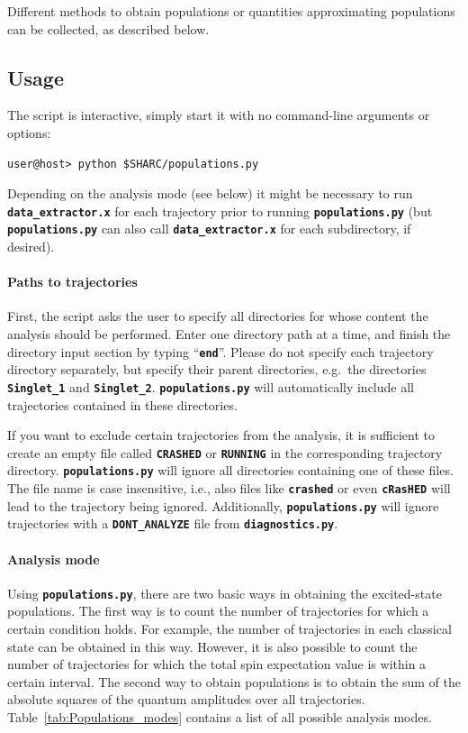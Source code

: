 \documentclass[a4paper,10pt,DIV=15,openany,twoside=false]{scrbook}
\newcommand{\ttt}[1]{\textbf{\texttt{#1}}}
\begin{document}
Different methods to obtain populations or quantities approximating populations can be collected, as described below.

\subsection{Usage}

The script is interactive, simply start it with no command-line arguments or options:
\begin{verbatim}
user@host> python $SHARC/populations.py
\end{verbatim}

Depending on the analysis mode (see below) it might be necessary to run \ttt{data\_extractor.x} for each trajectory prior to running \ttt{populations.py} (but \ttt{populations.py} can also call \ttt{data\_extractor.x} for each subdirectory, if desired). 

\paragraph{Paths to trajectories}

First, the script asks the user to specify all directories for whose content the analysis should be performed. Enter one directory path at a time, and finish the directory input section by typing ``\ttt{end}''. Please do not specify each trajectory directory separately, but specify their parent directories, e.g.\ the directories \ttt{Singlet\_1} and \ttt{Singlet\_2}. \ttt{populations.py} will automatically include all trajectories contained in these directories.

If you want to exclude certain trajectories from the analysis, it is sufficient to create an empty file called \ttt{CRASHED} or \ttt{RUNNING} in the corresponding trajectory directory. \ttt{populations.py} will ignore all directories containing one of these files. The file name is case insensitive, i.e., also files like \ttt{crashed} or even \ttt{cRasHED} will lead to the trajectory being ignored.
Additionally, \ttt{populations.py} will ignore trajectories with a \ttt{DONT\_ANALYZE} file from \ttt{diagnostics.py}.

\paragraph{Analysis mode}

Using \ttt{populations.py}, there are two basic ways in obtaining the excited-state populations. The first way is to count the number of trajectories for which a certain condition holds. For example, the number of trajectories in each classical state can be obtained in this way. However, it is also possible to count the number of trajectories for which the total spin expectation value is within a certain interval. 
The second way to obtain populations is to obtain the sum of the absolute squares of the quantum amplitudes over all trajectories. Table~\ref{tab:Populations_modes} contains a list of all possible analysis modes.
\end{document}
